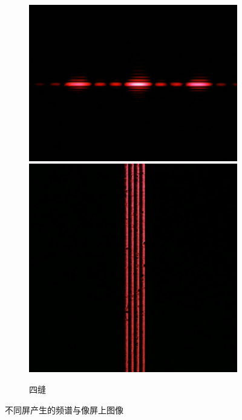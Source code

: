 \documentclass[a4paper]{article}
\begin{document}
\begin{figure}[htbp]
\begin{subfigure}[htbp]{0.3\textwidth}
        \includegraphics[width=\textwidth]{fre-done/3-2.JPG}
        \includegraphics[width=\textwidth]{img-done/3-2.JPG}
        \caption{四缝}
        \label{3-2}
    \end{subfigure}
    \captionsetup{format=cont,justification=centering,subrefformat=parens}
    \caption{不同屏产生的频谱与像屏上图像}
\end{figure}
\end{document}
